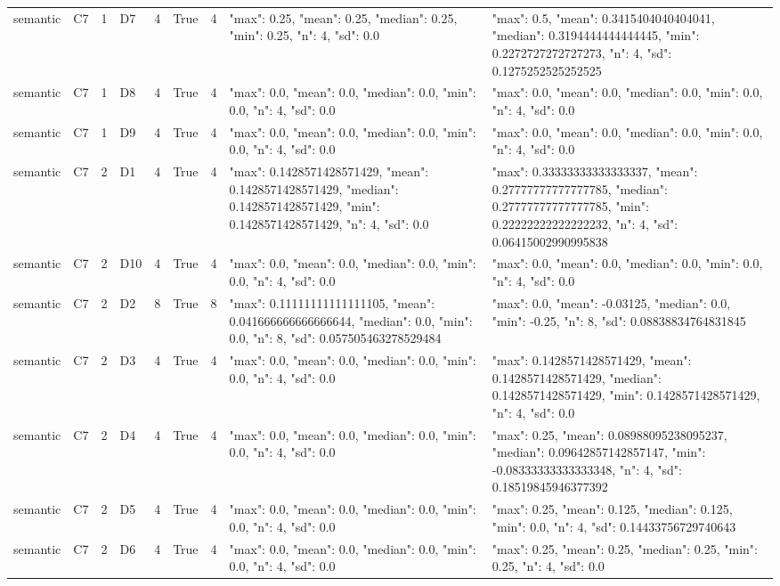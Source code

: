 \begin{tabular}{lllllllll}
semantic & C7 & 1 & D7 & 4 & True & 4 & {"max": 0.25, "mean": 0.25, "median": 0.25, "min": 0.25, "n": 4, "sd": 0.0} & {"max": 0.5, "mean": 0.3415404040404041, "median": 0.3194444444444445, "min": 0.2272727272727273, "n": 4, "sd": 0.1275252525252525} \\
semantic & C7 & 1 & D8 & 4 & True & 4 & {"max": 0.0, "mean": 0.0, "median": 0.0, "min": 0.0, "n": 4, "sd": 0.0} & {"max": 0.0, "mean": 0.0, "median": 0.0, "min": 0.0, "n": 4, "sd": 0.0} \\
semantic & C7 & 1 & D9 & 4 & True & 4 & {"max": 0.0, "mean": 0.0, "median": 0.0, "min": 0.0, "n": 4, "sd": 0.0} & {"max": 0.0, "mean": 0.0, "median": 0.0, "min": 0.0, "n": 4, "sd": 0.0} \\
semantic & C7 & 2 & D1 & 4 & True & 4 & {"max": 0.1428571428571429, "mean": 0.1428571428571429, "median": 0.1428571428571429, "min": 0.1428571428571429, "n": 4, "sd": 0.0} & {"max": 0.33333333333333337, "mean": 0.27777777777777785, "median": 0.27777777777777785, "min": 0.22222222222222232, "n": 4, "sd": 0.06415002990995838} \\
semantic & C7 & 2 & D10 & 4 & True & 4 & {"max": 0.0, "mean": 0.0, "median": 0.0, "min": 0.0, "n": 4, "sd": 0.0} & {"max": 0.0, "mean": 0.0, "median": 0.0, "min": 0.0, "n": 4, "sd": 0.0} \\
semantic & C7 & 2 & D2 & 8 & True & 8 & {"max": 0.11111111111111105, "mean": 0.041666666666666644, "median": 0.0, "min": 0.0, "n": 8, "sd": 0.057505463278529484} & {"max": 0.0, "mean": -0.03125, "median": 0.0, "min": -0.25, "n": 8, "sd": 0.08838834764831845} \\
semantic & C7 & 2 & D3 & 4 & True & 4 & {"max": 0.0, "mean": 0.0, "median": 0.0, "min": 0.0, "n": 4, "sd": 0.0} & {"max": 0.1428571428571429, "mean": 0.1428571428571429, "median": 0.1428571428571429, "min": 0.1428571428571429, "n": 4, "sd": 0.0} \\
semantic & C7 & 2 & D4 & 4 & True & 4 & {"max": 0.0, "mean": 0.0, "median": 0.0, "min": 0.0, "n": 4, "sd": 0.0} & {"max": 0.25, "mean": 0.08988095238095237, "median": 0.09642857142857147, "min": -0.08333333333333348, "n": 4, "sd": 0.18519845946377392} \\
semantic & C7 & 2 & D5 & 4 & True & 4 & {"max": 0.0, "mean": 0.0, "median": 0.0, "min": 0.0, "n": 4, "sd": 0.0} & {"max": 0.25, "mean": 0.125, "median": 0.125, "min": 0.0, "n": 4, "sd": 0.14433756729740643} \\
semantic & C7 & 2 & D6 & 4 & True & 4 & {"max": 0.0, "mean": 0.0, "median": 0.0, "min": 0.0, "n": 4, "sd": 0.0} & {"max": 0.25, "mean": 0.25, "median": 0.25, "min": 0.25, "n": 4, "sd": 0.0} \\

\end{tabular}
